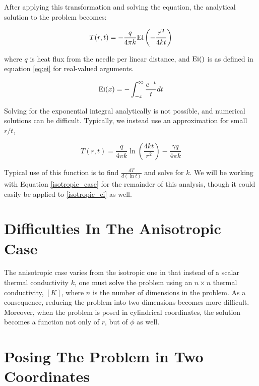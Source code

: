 After applying this transformation and solving the equation, the analytical
solution to the problem becomes:

\begin{equation}
\label{isotropic_ei}
T(r,t) = - \frac{q}{4\pi k}\textrm{Ei}\left(-\frac{r^2}{4kt}\right)
\end{equation}

where \(q\) is heat flux from the needle per linear distance, and \(\textrm{Ei}()\) is
as defined in equation \ref{eq:ei} for real-valued arguments.

\begin{equation}
\label{eq:ei}
\textrm{Ei}(x) = -\int_{-x}^{\infty} \frac{e^{-t}}{t}dt
\end{equation}

Solving for the exponential integral analytically is not possible, and numerical
solutions can be difficult. Typically, we instead use an approximation for small
\(r/t\),

\begin{equation}
\label{isotropic_case}
T(r,t) = \frac{q}{4\pi k}\ln\left(\frac{4kt}{r^2}\right) - \frac{\gamma q}{4\pi k}
\end{equation}

Typical use of this function is to find \(\frac{dT}{d(\ln t)}\) and solve
for \(k\). We will be working with Equation \ref{isotropic_case} for the remainder of
this analysis, though it could easily be applied to \ref{isotropic_ei} as well.


\section{Difficulties In The Anisotropic Case}
\label{sec:analytical-np:anisotropic-diff}


The anisotropic case varies from the isotropic one in that instead of a scalar 
thermal conductivity \(k\), one must solve the problem using an \(n \times n\)
thermal conductivity, \([K]\), where \(n\) is the number of dimensions in the
problem. As a consequence, reducing the problem into two dimensions becomes more
difficult. Moreover, when the problem is posed in cylindrical coordinates, the
solution becomes a function not only of \(r\), but of \(\phi\) as well.

\section{Posing The Problem in Two Coordinates}
\label{sec:analytical-np:2D}

